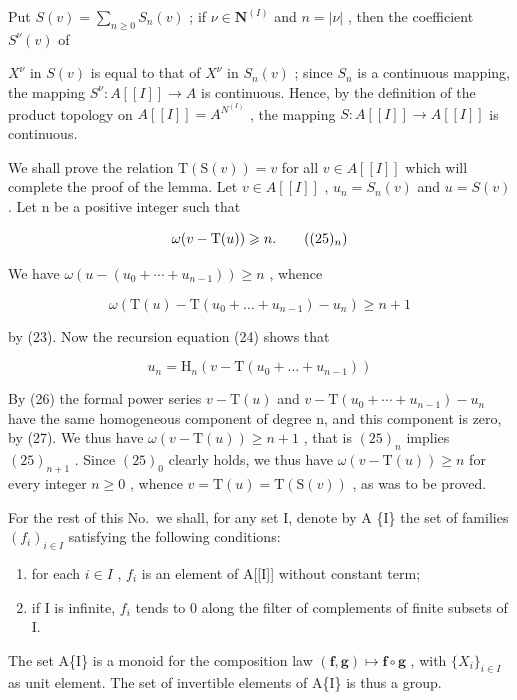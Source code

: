 Put \(S(v) = \sum_{n \geqslant 0} S_n(v)\) ; if \(\nu \in \mathbf{N}^{(I)}\) and \(n = |\nu|\) , then the coefficient \(S^{\nu}(v)\) of

\(X^{\nu}\) in \(S(v)\) is equal to that of \(X^{\nu}\) in \(S_{n}(v)\) ; since \(S_{n}\) is a continuous mapping, the mapping \(S^{\nu}: A[[I]] \to A\) is continuous. Hence, by the definition of the product topology on \(A[[I]] = A^{N^{(I)}}\) , the mapping \(S: A[[I]] \to A[[I]]\) is continuous.

We shall prove the relation \(\mathrm{T}(\mathrm{S}(v)) = v\) for all \(v \in A[[I]]\) which will complete the proof of the lemma. Let \(v \in A[[I]]\) , \(u_n = S_n(v)\) and \(u = S(v)\) . Let n be a positive integer such that

\[
\omega (v - \mathrm{T} (u)) \geqslant n.\tag{$(25)_{n}$}
\]

We have \(\omega(u - (u_{0} + \cdots + u_{n-1})) \geqslant n\) , whence

\[
\omega (\mathrm{T} (u) - \mathrm{T} (u _ {0} + \dots + u _ {n - 1}) - u _ {n}) \geqslant n + 1\tag{26}
\]

by (23). Now the recursion equation (24) shows that

\[
u _ {n} = \mathrm{H} _ {n} (v - \mathrm{T} (u _ {0} + \dots + u _ {n - 1}))\tag{27}
\]

By (26) the formal power series \(v - \mathrm{T}(u)\) and \(v - \mathrm{T}(u_{0} + \cdots + u_{n-1}) - u_{n}\) have the same homogeneous component of degree n, and this component is zero, by (27). We thus have \(\omega(v - \mathrm{T}(u)) \geqslant n + 1\) , that is \((25)_{n}\) implies \((25)_{n+1}\) . Since \((25)_{0}\) clearly holds, we thus have \(\omega(v - \mathrm{T}(u)) \geqslant n\) for every integer \(n \geqslant 0\) , whence \(v = \mathrm{T}(u) = \mathrm{T}(\mathrm{S}(v))\) , as was to be proved.

For the rest of this No.~we shall, for any set I, denote by A \{I\} the set of families \((f_i)_{i\in I}\) satisfying the following conditions:

\begin{enumerate}
\def\labelenumi{(\roman{enumi})}
\item
  for each \(i \in I\) , \(f_i\) is an element of A{[}{[}I{]}{]} without constant term;
\item
  if I is infinite, \(f_{i}\) tends to 0 along the filter of complements of finite subsets of I.
\end{enumerate}

The set A\{I\} is a monoid for the composition law \((\mathbf{f},\mathbf{g})\mapsto\mathbf{f}\circ\mathbf{g}\) , with \(\{X_{i}\}_{i\in I}\) as unit element. The set of invertible elements of A\{I\} is thus a group.

